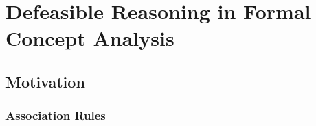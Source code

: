 \chapter{Defeasible Reasoning in Formal Concept Analysis}
\label{chapter:defeasible-reasoning-in-fca}



\section{Motivation}
\label{section:motivation}


\subsection{Association Rules}
\label{subsection:association-rules}



